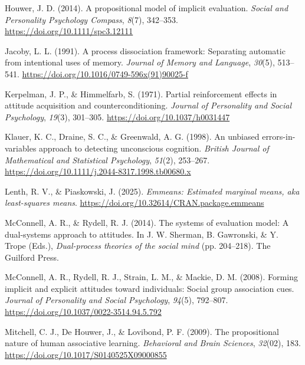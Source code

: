 \documentclass[
  man,floatsintext]{apa6}
\newlength{\cslhangindent}
\newlength{\cslentryspacingunit} %
\newenvironment{CSLReferences}[2] %
 {%
  \setlength{\parindent}{0pt}
  \ifodd #1
  \let\oldpar\par
  \def\par{\hangindent=\cslhangindent\oldpar}
  \fi
  \setlength{\parskip}{#2\cslentryspacingunit}
 }%
 {}
\begin{document}
\begin{CSLReferences}{1}{0}
\leavevmode{}%
Houwer, J. D. (2014). A propositional model of implicit evaluation. \emph{Social and Personality Psychology Compass}, \emph{8}(7), 342--353. \url{https://doi.org/10.1111/spc3.12111}

\leavevmode{}%
Jacoby, L. L. (1991). A process dissociation framework: Separating automatic from intentional uses of memory. \emph{Journal of Memory and Language}, \emph{30}(5), 513--541. \url{https://doi.org/10.1016/0749-596x(91)90025-f}

\leavevmode{}%
Kerpelman, J. P., \& Himmelfarb, S. (1971). Partial reinforcement effects in attitude acquisition and counterconditioning. \emph{Journal of Personality and Social Psychology}, \emph{19}(3), 301--305. \url{https://doi.org/10.1037/h0031447}

\leavevmode{}%
Klauer, K. C., Draine, S. C., \& Greenwald, A. G. (1998). An unbiased errors-in-variables approach to detecting unconscious cognition. \emph{British Journal of Mathematical and Statistical Psychology}, \emph{51}(2), 253--267. \url{https://doi.org/10.1111/j.2044-8317.1998.tb00680.x}

\leavevmode{}%
Lenth, R. V., \& Piaskowski, J. (2025). \emph{Emmeans: Estimated marginal means, aka least-squares means}. \url{https://doi.org/10.32614/CRAN.package.emmeans}

\leavevmode{}%
McConnell, A. R., \& Rydell, R. J. (2014). The systems of evaluation model: A dual-systems approach to attitudes. In J. W. Sherman, B. Gawronski, \& Y. Trope (Eds.), \emph{Dual-process theories of the social mind} (pp. 204--218). The Guilford Press.

\leavevmode{}%
McConnell, A. R., Rydell, R. J., Strain, L. M., \& Mackie, D. M. (2008). Forming implicit and explicit attitudes toward individuals: Social group association cues. \emph{Journal of Personality and Social Psychology}, \emph{94}(5), 792--807. \url{https://doi.org/10.1037/0022-3514.94.5.792}

\leavevmode{}%
Mitchell, C. J., De Houwer, J., \& Lovibond, P. F. (2009). The propositional nature of human associative learning. \emph{Behavioral and Brain Sciences}, \emph{32}(02), 183. \url{https://doi.org/10.1017/S0140525X09000855}


\end{CSLReferences}
\end{document}
